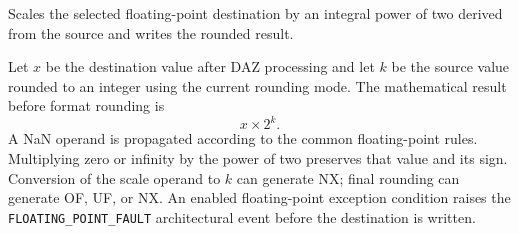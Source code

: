 Scales the selected floating-point destination by an integral power of two derived from the source and writes the rounded result.

Let \(x\) be the destination value after DAZ processing and let \(k\) be the source value rounded to an integer using the current rounding mode. The mathematical result before format rounding is
\[
  x \times 2^k .
\]
A NaN operand is propagated according to the common floating-point rules. Multiplying zero or infinity by the power of two preserves that value and its sign. Conversion of the scale operand to \(k\) can generate NX; final rounding can generate OF, UF, or NX. An enabled floating-point exception condition raises the \texttt{FLOATING\_POINT\_FAULT} architectural event before the destination is written.
